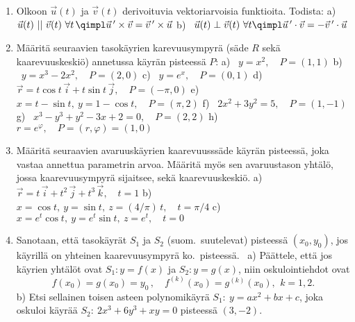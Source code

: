 \Harj
\begin{enumerate}

\item
Olkoon $\vec u(t)$ ja $\vec v(t)$ derivoituvia vektoriarvoisia funktioita. Todista: \newline
a) \ $\vec u(t)\ ||\ \vec v(t)\ \forall t \,\qimpl \vec u\,'\times\vec v=\vec v\,'\times\vec u$ 
\newline
b) \ $\vec u(t) \perp \vec v(t)\ \forall t  \qimpl \vec u\,'\cdot\vec v=-\vec v\,'\cdot\vec u$
 
\item
Määritä seuraavien tasokäyrien karevuusympyrä (säde $R$ sekä kaarevuuskeskiö) annetussa
käyrän pisteessä $P$: \newline
a) \ $y=x^2,\quad P=(1,1)$ \newline
b) \ $y=x^3-2x^2,\quad P=(2,0)$ \newline
c) \ $y=e^x,\quad P=(0,1)$ \newline
d) \ $\vec r=t\cos t\,\vec i+t\sin t\,\vec j,\quad P=(-\pi,0)$ \newline
e) \ $x=t-\sin t,\ y=1-\cos t,\quad P=(\pi,2)$ \newline
f) \ $2x^2+3y^2=5,\quad P=(1,-1)$ \newline
g) \ $x^3-y^3+y^2-3x+2=0,\quad P=(2,2)$ \newline
h) \ $r=e^\varphi,\quad P=(r,\varphi)=(1,0)$

\item
Määritä seuraavien avaruuskäyrien kaarevuusssäde käyrän pisteessä, joka vastaa annettua
parametrin arvoa. Määritä myös sen avaruustason yhtälö, jossa kaarevuusympyrä sijaitsee, sekä
kaarevuuskeskiö. \newline
a) \ $\vec r=t\,\vec i+t^2\,\vec j+t^3\,\vec k,\quad t=1$ \newline
b) \ $x=\cos t,\ y=\sin t,\ z=(4/\pi)\,t,\quad t=\pi/4$ \newline
c) \ $x=e^t\cos t,\ y=e^t\sin t,\ z=e^t,\quad t=0$

\item {}
Sanotaan, että tasokäyrät $S_1$ ja $S_2$  (suom.\ suutelevat) pisteessä 
$(x_0,y_0)$, jos käyrillä on yhteinen kaarevuusympyrä ko.\ pisteessä. \ a) Päättele, että jos 
käyrien yhtälöt ovat $S_1: y=f(x)$ ja $S_2: y=g(x)$, niin oskulointiehdot ovat
\[
f(x_0)=g(x_0)=y_0\,, \quad f^{(k)}(x_0)=g^{(k)}(x_0),\,\ k=1,2.
\]
b) Etsi sellainen toisen asteen polynomikäyrä $S_1:\ y=ax^2+bx+c$, joka oskuloi käyrää
$S_2:\ 2x^3+6y^3+xy=0$ pisteessä $(3,-2)$.


\end{enumerate}
